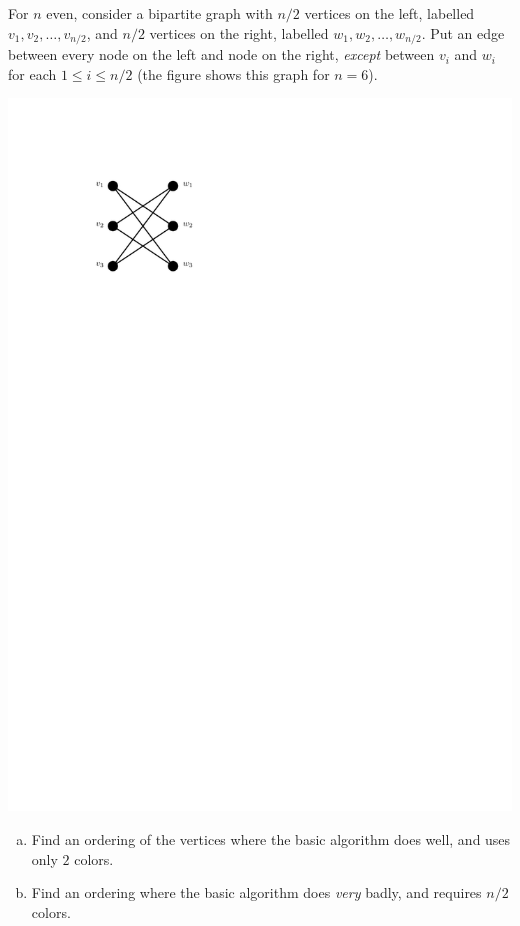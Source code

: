 \documentclass[12pt]{article}
\begin{document}
For $n$ even, consider a bipartite graph with $n/2$ vertices on the left, labelled $v_1, v_2, \ldots, v_{n/2}$, and $n/2$ vertices on the right, labelled $w_1, w_2, \ldots, w_{n/2}$.
Put an edge between every node on the left and node on the right, \emph{except} between $v_i$ and $w_i$ for each $1 \leq i \leq n/2$ (the figure shows this graph for $n=6$).

\begin{center}
    \includegraphics[scale=1.3]{bipartite}
\end{center}
\begin{enumerate}[(a)]
    \item %
        Find an ordering of the vertices where the basic algorithm does well, and uses only $2$ colors.
    \item Find an ordering where the basic algorithm does \emph{very} badly, and requires $n/2$ colors. 
\end{enumerate}
\end{document}
